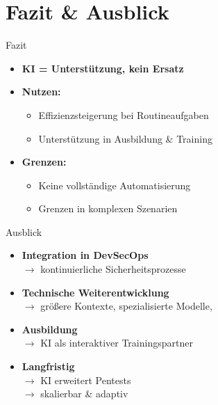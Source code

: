 \documentclass[
	aspectratio=169,	%
	onlytextwidth,		%
	t,					%
	]{beamer}
\begin{document}
\section{Fazit \& Ausblick}
\begin{frame}{Fazit}
	\begin{itemize}
		\item \textbf{KI = Unterstützung, kein Ersatz}  
			\vspace{2mm}
		\item \textbf{Nutzen:}
		\begin{itemize}
			\item Effizienzsteigerung bei Routineaufgaben
			\item Unterstützung in Ausbildung \& Training
		\end{itemize}
			\vspace{2mm}
		\item \textbf{Grenzen:}
		\begin{itemize}
			\item Keine vollständige Automatisierung
			\item Grenzen in komplexen Szenarien
		\end{itemize}
	\end{itemize}
\end{frame}









\begin{frame}{Ausblick}
	\begin{itemize}
		\item \textbf{Integration in DevSecOps}  \\
		\hspace{1em} $\rightarrow$ kontinuierliche Sicherheitsprozesse
		\vspace{2mm}
		\item \textbf{Technische Weiterentwicklung} \\
		\hspace{1em} 
		$\rightarrow$ größere Kontexte, spezialisierte Modelle, 
		\vspace{2mm}
		\item \textbf{Ausbildung}  \\
		\hspace{1em}
		$\rightarrow$ KI als interaktiver Trainingspartner
		\vspace{2mm}
		\item \textbf{Langfristig}  \\
		\hspace{1em}
		$\rightarrow$ KI erweitert Pentests \\
		\hspace{1em} 
		$\rightarrow$ skalierbar \& adaptiv
	\end{itemize}
\end{frame}
\end{document}
